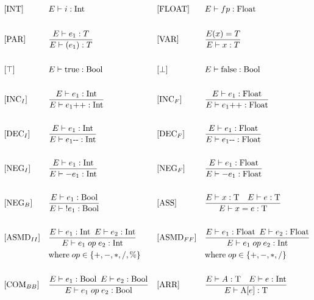 \begin{align*}
&[\text{INT}]           &  &E \vdash i : \text{Int} & 
&[\text{FLOAT}]           &  &E \vdash fp : \text{Float}\\\\
%
&[\text{PAR}]           &  &\frac{E \vdash e_1 : T}{E \vdash (e_1) : T} & 
&[\text{VAR}]           &  &\frac{E(x) = T}{E \vdash x : T}\\\\
%
&[\top]           &  &E \vdash \text{true} : \text{Bool} & 
&[\bot]           &  &E \vdash \text{false} : \text{Bool}\\\\
%
&[\text{INC}_I]           &  &\frac{E \vdash e_1 : \text{Int}}{E \vdash e_1\text{++} : \text{Int}} & 
&[\text{INC}_F]           &  &\frac{E \vdash e_1 : \text{Float}}{E \vdash e_1\text{++} : \text{Float}}\\\\
%
&[\text{DEC}_I]           &  &\frac{E \vdash e_1 : \text{Int}}{E \vdash e_1\text{-\medskip-} : \text{Int}} & 
&[\text{DEC}_F]           &  &\frac{E \vdash e_1 : \text{Float}}{E \vdash e_1\text{-\medskip-} : \text{Float}}\\\\
%
&[\text{NEG}_I]           &  &\frac{E \vdash e_1 : \text{Int}}{E \vdash -e_1 : \text{Int}} & 
&[\text{NEG}_F]           &  &\frac{E \vdash e_1 : \text{Float}}{E \vdash -e_1 : \text{Float}}\\\\
%
&[\text{NEG}_B]           &  &\frac{E \vdash e_1 : \text{Bool}}{E \vdash\; !\smallskip e_1 : \text{Bool}} &
&[\text{ASS}]           &  &\frac{E \vdash x : \text{T}\quad E \vdash e : \text{T}}{E \vdash x = e : \text{T}}\\\\
%
&[\text{ASMD}_{II}]           &  &\frac{E \vdash e_1 : \text{Int} \enskip E \vdash e_2 : \text{Int}}{E \vdash e_1\; op \;e_2 : \text{Int}} & &[\text{ASMD}_{FF}]           &  &\frac{E \vdash e_1 : \text{Float} \enskip E \vdash e_2 : \text{Float}}{E \vdash e_1\; op \;e_2 : \text{Int}}\\    
& & &\text{where}\; op \in \{+, -, *, /, \%\} & & & &\text{where}\; op \in \{+, -, *, /\}\\\\
%
&[\text{COM}_{BB}]           &  &\frac{E \vdash e_1 : \text{Bool} \enskip E \vdash e_2 : \text{Bool}}{E \vdash e_1\; op \;e_2 : \text{Bool}}&&[\text{ARR}]      &    &\frac{E \vdash A : \text{T}\quad E \vdash e : \text{Int}}{E \vdash \text{A[}e\text{]} : \text{T}}\\

\end{align*}
